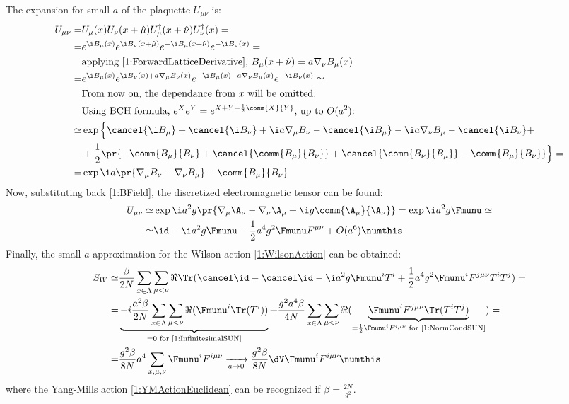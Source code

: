 The expansion for small $a$ of the plaquette $U_{\mu\nu}$ is:
\begin{align*}
    U_{\mu\nu} =& U_\mu(x)U_\nu(x+\hat\mu)U^\dagger_\mu(x+\hat\nu)U^\dagger_\nu(x) = \\
    =& e^{\i B_\mu(x)}e^{\i B_\nu(x+\hat\mu)}e^{-\i B_\mu(x+\hat\nu)}e^{-\i B_\nu(x)} = \\
    &\text{applying \eqref{1:ForwardLatticeDerivative}, } B_\mu(x+\hat\nu) = a\nabla_\nu B_\mu(x) \\
    =& e^{\i B_\mu(x)}e^{\i B_\nu(x)+a\nabla_\mu B_\nu(x)}e^{-\i B_\mu(x)-a\nabla_\nu B_\mu(x)}e^{-\i B_\nu(x)} \simeq \\
    &\text{From now on, the dependance from $x$ will be omitted.}\\
    &\text{Using BCH formula, } e^Xe^Y = e^{X+Y+\frac12\comm{X}{Y}}\text{, up to $O(a^2)$:} \\
    \simeq& \exp\Big\{\cancel{\i B_\mu} + \cancel{\i B_\nu} + \i a \nabla_\mu B_\nu - \cancel{\i B_\mu} - \i a \nabla_\nu B_\mu - \cancel{\i B_\nu}+\\
    &+\frac12\pr{-\comm{B_\mu}{B_\nu}+\cancel{\comm{B_\mu}{B_\nu}}+\cancel{\comm{B_\nu}{B_\mu}}-\comm{B_\mu}{B_\nu}}\Big\} = \\
    =& \exp{\i a\pr{\nabla_\mu B_\nu - \nabla_\nu B_\mu} - \comm{B_\mu}{B_\nu}}
\end{align*}
Now, substituting back \eqref{1:BField}, the discretized electromagnetic tensor can be found:
\begin{align*}
    U_{\mu\nu} \simeq& \exp{\i a^2 g \pr{\nabla_\mu \A_\nu - \nabla_\nu \A_\mu+ \i g \comm{\A_\mu}{\A_\nu}}} =  \exp{\i a^2 g \Fmunu} \simeq \\
    \simeq& \id + \i a^2 g \Fmunu - \frac12 a^4 g^2 \Fmunu F^{\mu\nu} + O(a^6) \numthis \label{1:PlaquetteSmalla}
\end{align*}
Finally, the small-$a$ approximation for the Wilson action \eqref{1:WilsonAction} can be obtained:
\begin{align*}
    S_W \simeq& \frac{\beta}{2N} \sum_{x\in\Lambda}\sum_{\mu<\nu} \Re\Tr(\cancel\id - \cancel\id - \i a^2 g \Fmunu^i T^i + \frac12a^4 g^2 \Fmunu^i F^{j\mu\nu}T^iT^j) = \\
    =& \underbrace{-i\frac{a^2\beta}{2N} \sum_{x\in\Lambda}\sum_{\mu<\nu} \Re(\Fmunu^i \Tr(T^i))}_{=0\text{ for \eqref{1:InfinitesimalSUN}}} + \frac{g^2a^4\beta}{4N} \sum_{x\in\Lambda}\sum_{\mu<\nu} \Re(\underbrace{\Fmunu^i F^{j\mu\nu}\Tr(T^iT^j)}_{=\frac12\Fmunu^i F^{i\mu\nu}\text{ for \eqref{1:NormCondSUN}}}) = \\
    =& \frac{g^2\beta}{8N} a^4\sum_{x,\mu,\nu}\Fmunu^i F^{i\mu\nu} \xrightarrow[a\to0]{} \frac{g^2\beta}{8N} \dV\Fmunu^i F^{i\mu\nu} \numthis \label{1:WilsonSmalla}
\end{align*}
where the Yang-Mills action \eqref{1:YMActionEuclidean} can be recognized if $\beta = \frac{2N}{g^2}$.

